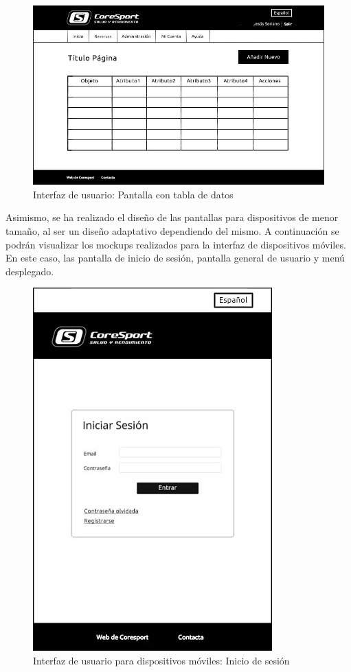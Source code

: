 \begin{figure}[H]
\centering
  \includegraphics[scale=.40]{img/interfaz/cuadro-general.jpg}
  \caption{Interfaz de usuario: Pantalla con tabla de datos}
  \label{fig:interfaz-cuadro-general}
\end{figure}


Asimismo, se ha realizado el diseño de las pantallas para dispositivos de menor tamaño, al ser un diseño adaptativo dependiendo del mismo. A continuación se podrán visualizar los mockups realizados para la interfaz de dispositivos móviles. En este caso, las pantalla de inicio de sesión, pantalla general de usuario y menú desplegado.


\begin{figure}[H]
\centering
  \includegraphics[scale=.50]{img/interfaz/inicio-sesion-movil.jpg}
  \caption{Interfaz de usuario para dispositivos móviles: Inicio de sesión}
  \label{fig:interfaz-inicio-sesion-movil}
\end{figure}

